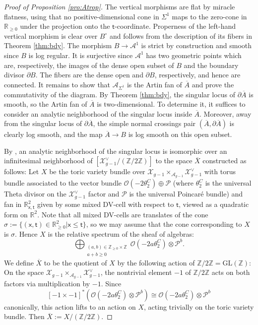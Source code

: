 \documentclass[11pt]{article}
\def\A{\mathcal{A}}
\def\GL{\mathrm{GL}}
\newcommand{\barA}{\overline{A}}
\theoremstyle{definition}
\begin{document}
\begin{proof}[Proof of Proposition \ref{pro:Atrop}]
	The vertical morphisms are flat by miracle flatness, using that no positive-dimensional cone in $\Sigma^1$ maps to the
	zero-cone in $\mathbb{R}_{\ge 0}$ under the projection onto the $\mathsf{t}$-coordinate. Properness of the left-hand vertical morphism
	is clear over $B^{\circ}$ and follows from the description of its fibers in Theorem \ref{thm:bdy}.
	The morphism $B \to \A^1$ is strict by construction and smooth since $B$ is log regular. It is surjective since $\A^{1}$ has two geometric points which are, respectively, the images of the dense open subset of $B$ and the boundary divisor
	$\partial B$. The fibers are the dense open and $\partial B$, respectively, and hence are connected.
	It remains to show that $\mathcal{A}_{\Sigma^{1}}$ is the Artin fan of $\barA$ and prove the commutativity of the diagram.
	By Theorem \ref{thm:bdy}, the singular locus of $\partial\barA$
	is smooth, so the Artin fan of $\barA$ is two-dimensional. To determine
	it, it suffices to consider an analytic neighborhood
	of the singular locus inside $\barA$. Moreover, away from the singular locus of $\partial\barA$, the
	simple normal crossings pair $(\barA,\partial\barA)$ is clearly log smooth, and the map $\barA\to B$ is
	log smooth on this open subset.

    By \cite[Theorem 1.13 (3)]{FC},
	an analytic neighborhood of the singular locus is isomorphic
	over an infinitesimal neighborhood of $[\mathcal{X}_{g-1}^{\vee}/(\mathbb{Z}/2\mathbb{Z})]$ to the
	space $\overline{X}$ constructed as follows: Let $X$ be the toric variety
	bundle over $\mathcal{X}_{g-1}\times_{\mathcal{A}_{g-1}} \mathcal{X}_{g-1}^{\vee}$ with
	torus bundle associated to the vector bundle
	$\mathcal{O}(-2\theta_2^C)\oplus \mathcal{P}$ (where $\theta_2^C$
	is the universal Theta divisor on the $\mathcal{X}_{g-1}^{\vee}$
	factor and $\mathcal{P}$ is the universal Poincar\'e bundle) and fan
	in $\mathbb{R}_{\mathsf{x},\mathsf{t}}^{2}$ given by some mixed DV-cell
	with respect to $\mathsf{t}$, viewed as a quadratic form on $\mathbb{R}^{2}$.
	Note that all mixed DV-cells are translates of the cone
	$\sigma:=\{(\mathsf{x},\mathsf{t})\in \mathbb{R}_{\ge 0}^{2}|\mathsf{x}\le \mathsf{t}\}$, so we may
	assume that the cone corresponding to $X$ is $\sigma$. Hence
	$X$ is the relative spectrum of the sheaf of algebras:
	$$\bigoplus_{\substack{(a,b)\in \mathbb{Z}_{\ge 0}\times\mathbb{Z}\\a+b\ge 0}}\mathcal{O}(-2a\theta_2^C)\otimes \mathcal{P}^{b}.$$
	We define $\overline{X}$ to be the quotient of $X$ by the following action
	of $\mathbb{Z}/2\mathbb{Z}=\GL(\mathbb{Z})$: On the space
	$\mathcal{X}_{g-1}\times_{\mathcal{A}_{g-1}}\mathcal{X}_{g-1}^{\vee}$, the nontrivial
	element $-1$ of $\mathbb{Z}/2\mathbb{Z}$ acts on both factors via multiplication by $-1$.
	Since
	$$[-1\times -1]^{\ast}(\mathcal{O}(-2a\theta_2^C)\otimes \mathcal{P}^{b})\cong \mathcal{O}(-2a\theta_2^C)\otimes \mathcal{P}^{b}$$
	canonically, this action lifts to an action on $X$, acting trivially on the toric variety bundle. Then
	$\overline{X}:=X/(\mathbb{Z}/2\mathbb{Z})$.


\end{proof}
\end{document}
